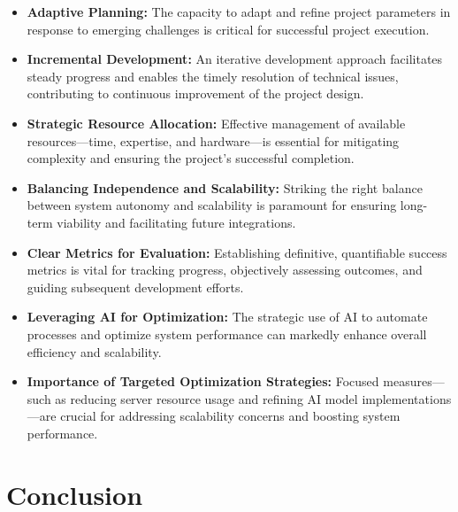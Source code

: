 \begin{itemize}
    \item \textbf{Adaptive Planning:} The capacity to adapt and refine project parameters in response to emerging challenges is critical for successful project execution.
    \item \textbf{Incremental Development:} An iterative development approach facilitates steady progress and enables the timely resolution of technical issues, contributing to continuous improvement of the project design.
    \item \textbf{Strategic Resource Allocation:} Effective management of available resources—time, expertise, and hardware—is essential for mitigating complexity and ensuring the project’s successful completion.
    \item \textbf{Balancing Independence and Scalability:} Striking the right balance between system autonomy and scalability is paramount for ensuring long-term viability and facilitating future integrations.
    \item \textbf{Clear Metrics for Evaluation:} Establishing definitive, quantifiable success metrics is vital for tracking progress, objectively assessing outcomes, and guiding subsequent development efforts.
    \item \textbf{Leveraging AI for Optimization:} The strategic use of AI to automate processes and optimize system performance can markedly enhance overall efficiency and scalability.
    \item \textbf{Importance of Targeted Optimization Strategies:} Focused measures—such as reducing server resource usage and refining AI model implementations—are crucial for addressing scalability concerns and boosting system performance.
\end{itemize}



\section{Conclusion}


